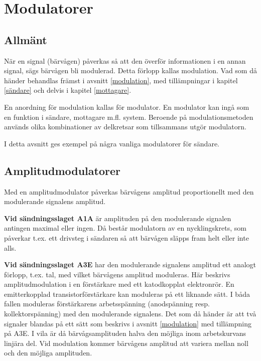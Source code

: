 \section{Modulatorer}

\subsection{Allmänt}

När en signal (bärvågen) påverkas så att den överför informationen i
en annan signal, sägs bärvågen bli modulerad.
Detta förlopp kallas modulation.
Vad som då händer behandlas främst i avsnitt \ref{modulation}, med
tillämpningar i kapitel \ref{sändare} och delvis i kapitel \ref{mottagare}.

En anordning för modulation kallas för modulator.
En modulator kan ingå som en funktion i sändare, mottagare m.fl. system.
Beroende på modulationsmetoden används olika kombinationer av delkretsar som
tillsammans utgör modulatorn.

I detta avsnitt ges exempel på några vanliga modulatorer för sändare.

\subsection{Amplitudmodulatorer}

Med en amplitudmodulator påverkas bärvågens amplitud proportionellt
med den modulerande signalens amplitud.

\textbf{Vid sändningsslaget A1A} är amplituden på den modulerande signalen
antingen maximal eller ingen.
Då består modulatorn av en nycklingskrets, som påverkar t.ex. ett drivsteg i
sändaren så att bärvågen släpps fram helt eller inte alls.

\textbf{Vid sändningsslaget A3E} har den modulerande signalens amplitud
ett analogt förlopp, t.ex. tal, med vilket bärvågens amplitud moduleras.
Här beskrivs amplitudmodulation i en förstärkare med ett katodkopplat
elektronrör.
En emitterkopplad transistorförstärkare kan moduleras på ett liknande sätt.
I båda fallen moduleras förstärkarens arbetsspänning (anodspänning resp.
kollektorspänning) med den modulerande signalens.
Det som då händer är att två signaler blandas på ett sätt som beskrivs i
avsnitt \ref{modulation} med tillämpning på A3E.
I vila är då bärvågsamplituden halva den möjliga inom arbetskurvans linjära del.
Vid modulation kommer bärvågens amplitud att variera mellan noll
och den möjliga amplituden.

